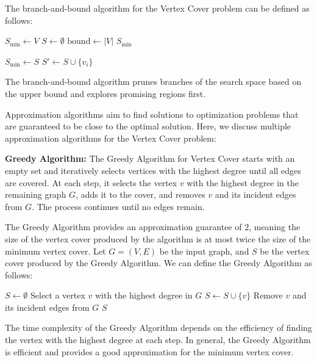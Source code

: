 The branch-and-bound algorithm for the Vertex Cover problem can be defined as follows:
\FloatBarrier
\begin{algorithm}
\caption{Branch-and-Bound Vertex Cover}
\begin{algorithmic}[1]
\State $S_{\text{min}} \gets V$
\State $S \gets \emptyset$
\State $\text{bound} \gets |V|$
\State {}
\State \Return $S_{\text{min}}$
\EndFunction

        \State $S_{\text{min}} \gets S$
    \EndIf
{}
    \State $S' \gets S \cup \{v_i\}$
        \State {}
    \EndIf
    \State {}
\EndIf
\EndFunction
\end{algorithmic}
\end{algorithm}

\FloatBarrier
The branch-and-bound algorithm prunes branches of the search space based on the upper bound and explores promising regions first.

Approximation algorithms aim to find solutions to optimization problems that are guaranteed to be close to the optimal solution. Here, we discuss multiple approximation algorithms for the Vertex Cover problem:

\textbf{Greedy Algorithm:} The Greedy Algorithm for Vertex Cover starts with an empty set and iteratively selects vertices with the highest degree until all edges are covered. At each step, it selects the vertex \(v\) with the highest degree in the remaining graph \(G\), adds it to the cover, and removes \(v\) and its incident edges from \(G\). The process continues until no edges remain.

The Greedy Algorithm provides an approximation guarantee of \(2\), meaning the size of the vertex cover produced by the algorithm is at most twice the size of the minimum vertex cover. Let \(G = (V, E)\) be the input graph, and \(S\) be the vertex cover produced by the Greedy Algorithm. We can define the Greedy Algorithm as follows:
\FloatBarrier
\begin{algorithm}
\caption{Greedy Vertex Cover}
\begin{algorithmic}[1]
\State $S \gets \emptyset$
    \State Select a vertex $v$ with the highest degree in $G$
    \State $S \gets S \cup \{v\}$
    \State Remove $v$ and its incident edges from $G$
\EndWhile
\State \Return $S$
\EndFunction
\end{algorithmic}
\end{algorithm}
\FloatBarrier
The time complexity of the Greedy Algorithm depends on the efficiency of finding the vertex with the highest degree at each step. In general, the Greedy Algorithm is efficient and provides a good approximation for the minimum vertex cover.

